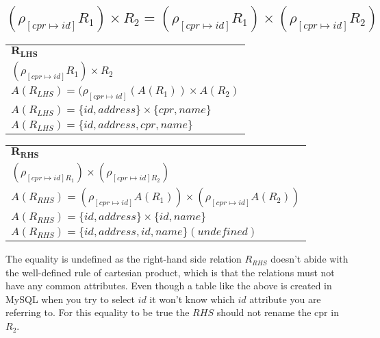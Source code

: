 \subsection{\normalsize{$(\rho_{[cpr \mapsto id]}R_1) \times R_2 = (\rho_{[cpr \mapsto id]}R_1) \times (\rho_{[cpr \mapsto id]}R_2)$}}

\begin{table}[ht]
	\begin{tabular}{l}
		$\bm{R_{LHS}}$  \\
		$(\rho_{[cpr \mapsto id]}R_1) \times R_2$  \\
		$A(R_{LHS}) = (\rho_{[cpr\mapsto id]}(A(R_1)) \times A(R_2)$  \\
		$A(R_{LHS}) = \{id, address\} \times \{cpr, name\}$  \\
		$A(R_{LHS}) = \{id, address, cpr, name\}$
	\end{tabular}
\end{table}

\begin{table}[ht]
	\begin{tabular}{l}
		$\bm{R_{RHS}}$ \\
	 	$(\rho_{[cpr \mapsto id]R_1}) \times (\rho_{[cpr \mapsto id]R_2})$ \\
		$A(R_{RHS}) = (\rho_{[cpr\mapsto id]}A(R_1)) \times (\rho_{[cpr \mapsto id]}A(R_2))$ \\
		$A(R_{RHS}) = \{id, address\} \times \{id, name\}$ \\
		$A(R_{RHS}) = \{id, address, id, name\}(undefined)$ 
	\end{tabular}
\end{table}
\FloatBarrier

The equality is undefined as the right-hand side relation $R_{RHS}$ doesn't abide with the well-defined rule of cartesian product, which is that the relations must not have any common attributes. Even though a table like the above is created in MySQL when you try to select $id$ it won't know which $id$ attribute you are referring to.
For this equality to be true the $RHS$ should not rename the cpr in $R_2$.\\\\

